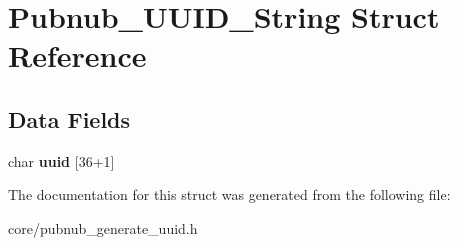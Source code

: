 \hypertarget{structPubnub__UUID__String}{\section{Pubnub\-\_\-\-U\-U\-I\-D\-\_\-\-String Struct Reference}
\label{structPubnub__UUID__String}
}
\subsection*{Data Fields}
\begin{DoxyCompactItemize}
\item 
\hypertarget{structPubnub__UUID__String_a2528049840ae0036cba7083e1a0d4718}{char {\bfseries uuid} \mbox{[}36+1\mbox{]}}\label{structPubnub__UUID__String_a2528049840ae0036cba7083e1a0d4718}

\end{DoxyCompactItemize}


The documentation for this struct was generated from the following file\-:\begin{DoxyCompactItemize}
\item 
core/pubnub\-\_\-generate\-\_\-uuid.\-h\end{DoxyCompactItemize}
